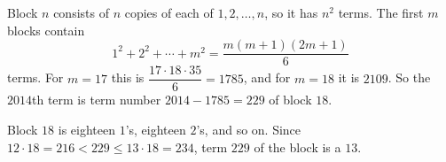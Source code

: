 Block $n$ consists of $n$ copies of each of $1,2,\dots,n$, so it has $n^2$ terms. The first $m$ blocks contain
\[
1^2+2^2+\cdots+m^2=\dfrac{m(m+1)(2m+1)}{6}
\]
terms. For $m=17$ this is $\dfrac{17\cdot18\cdot35}{6}=1785$, and for $m=18$ it is $2109$. So the $2014$th term is term number $2014-1785=229$ of block $18$.

Block $18$ is eighteen $1$'s, eighteen $2$'s, and so on. Since $12\cdot18=216<229\le13\cdot18=234$, term $229$ of the block is a $\boxed{13}$.
